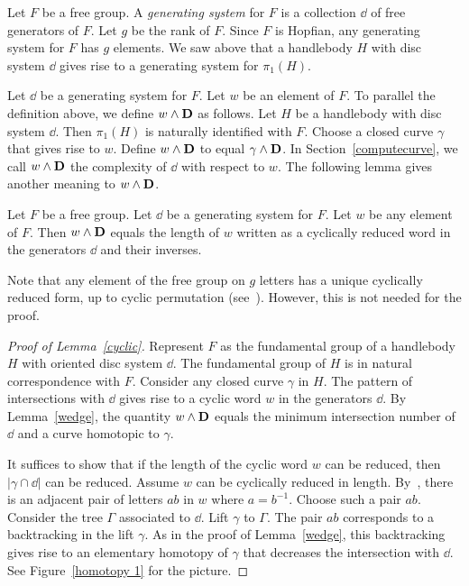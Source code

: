Let $F$ be a free group.  A \emph{generating system} for $F$ is a collection $\dd$ of free generators of $F$.  Let $g$ be the rank of $F$.  Since $F$ is Hopfian, any generating system for $F$ has $g$ elements.  We saw above that a handlebody $H$ with disc system $\dd$ gives rise to a generating system for $\pi_{1}(H)$.  

Let $\dd$ be a generating system for $F$.  Let $w$ be an element of $F$.  To parallel the definition above, we define $w\wedge\mathbf{D}$ as follows.  Let $H$ be a handlebody with disc system $\dd$.  Then $\pi_{1}(H)$ is naturally identified with $F$.  Choose a closed curve $\gamma$ that gives rise to $w$.  Define $w\wedge\mathbf{D}$ to equal $\gamma\wedge\mathbf{D}$.  In Section~\ref{computecurve}, we call $w\wedge\mathbf{D}$ the complexity of $\dd$ with respect to $w$.  The following lemma gives another meaning to $w\wedge\mathbf{D}$.

\begin{lemma}
\label{cyclic}
Let $F$ be a free group.  Let $\dd$ be a generating system for $F$.  Let $w$ be any element of $F$.  Then $w\wedge\mathbf{D}$ equals the length of $w$ written as a cyclically reduced word in the generators $\dd$ and their inverses.
\end{lemma}

Note that any element of the free group on $g$ letters has a unique cyclically reduced form, up to cyclic permutation (see~\cite[Sec. 1.4]{MKS}).  However, this is not needed for the proof.

\begin{proof}[Proof of Lemma~\ref{cyclic}]
Represent $F$ as the fundamental group of a handlebody $H$ with oriented disc system $\dd$.  The fundamental group of $H$ is in natural correspondence with $F$.  Consider any closed curve $\gamma$ in $H$.  The pattern of intersections with $\dd$ gives rise to a cyclic word $w$ in the generators $\dd$.  By Lemma~\ref{wedge}, the quantity $w\wedge\mathbf{D}$ equals the minimum intersection number of $\dd$ and a curve homotopic to $\gamma$.

It suffices to show that if the length of the cyclic word $w$ can be reduced, then $|\gamma\cap\dd|$ can be reduced.  Assume $w$ can be cyclically reduced in length.  By~\cite[Sec. 1.4]{MKS}, there is an adjacent pair of letters $ab$ in $w$ where $a=b^{-1}$.  Choose such a pair $ab$.  Consider the tree $\Gamma$ associated to $\dd$.  Lift $\gamma$ to $\Gamma$.  The pair $ab$ corresponds to a backtracking in the lift $\gamma$.  As in the proof of Lemma~\ref{wedge}, this backtracking gives rise to an elementary homotopy of $\gamma$ that decreases the intersection with $\dd$.  See Figure~\ref{homotopy 1} for the picture.
\end{proof}

